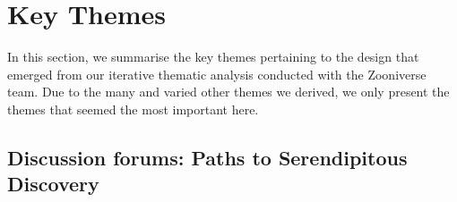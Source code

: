 \documentclass{sigchi}
\begin{document}



\section{Key Themes}

In this section, we summarise the key themes pertaining to the design that emerged from our iterative thematic analysis conducted with the Zooniverse team.  Due to the many and varied other themes we derived, we only present the themes that seemed the most important here.

\subsection{Discussion forums: Paths to Serendipitous Discovery}
\end{document}
